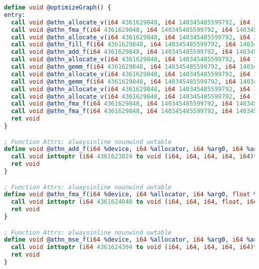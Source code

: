 \begin{lstlisting}[language=llvm,basicstyle=\small,caption=Пример LLVM IR]
define void @optimizeGraph() {
entry:
  call void @athn_allocate_v(i64 4361629848, i64 140345485599792, i64 140345485573008)
  call void @athn_fma_f(i64 4361629848, i64 140345485599792, i64 140345485620352, float 2.000000e+00, i64 140345485611632, float -2.000000e+00, i64 140345485573008)
  call void @athn_allocate_v(i64 4361629848, i64 140345485599792, i64 140345485573088)
  call void @athn_fill_f(i64 4361629848, i64 140345485599792, i64 140345485573088, float 0.000000e+00)
  call void @athn_add_f(i64 4361629848, i64 140345485599792, i64 140345485573088, i64 140345485573008, i64 140345485573088)
  call void @athn_allocate_v(i64 4361629848, i64 140345485599792, i64 140345485612688)
  call void @athn_gemm_f(i64 4361629848, i64 140345485599792, i64 140345485592208, i64 140345485573088, i64 140345485616152, i64 140345485612688)
  call void @athn_allocate_v(i64 4361629848, i64 140345485599792, i64 140345485612736)
  call void @athn_gemm_f(i64 4361629848, i64 140345485599792, i64 140345485595808, i64 140345485613576, i64 140345485573088, i64 140345485612736)
  call void @athn_allocate_v(i64 4361629848, i64 140345485599792, i64 140345485573088)
  call void @athn_allocate_v(i64 4361629848, i64 140345485599792, i64 140345485573088)
  call void @athn_fma_f(i64 4361629848, i64 140345485599792, i64 140345485612736, float 0xBE7AD7F2A0000000, i64 140345485616152, float 1.000000e+00, i64 140345485616152)
  call void @athn_fma_f(i64 4361629848, i64 140345485599792, i64 140345485612688, float 0xBE7AD7F2A0000000, i64 140345485613576, float 1.000000e+00, i64 140345485613576)
  ret void
}

; Function Attrs: alwaysinline nounwind uwtable
define void @athn_add_f(i64 %device, i64 %allocator, i64 %arg0, i64 %arg1, i64 %arg2) #0 {
  call void inttoptr (i64 4361623824 to void (i64, i64, i64, i64, i64)*)(i64 %device, i64 %allocator, i64 %arg0, i64 %arg1, i64 %arg2)
  ret void
}

; Function Attrs: alwaysinline nounwind uwtable
define void @athn_fma_f(i64 %device, i64 %allocator, i64 %arg0, float %arg1, i64 %arg2, float %arg3, i64 %arg4) #0 {
  call void inttoptr (i64 4361624048 to void (i64, i64, i64, float, i64, float, i64)*)(i64 %device, i64 %allocator, i64 %arg0, float %arg1, i64 %arg2, float %arg3, i64 %arg4)
  ret void
}

; Function Attrs: alwaysinline nounwind uwtable
define void @athn_mse_f(i64 %device, i64 %allocator, i64 %arg0, i64 %arg1, i64 %arg2) #0 {
  call void inttoptr (i64 4361624304 to void (i64, i64, i64, i64, i64)*)(i64 %device, i64 %allocator, i64 %arg0, i64 %arg1, i64 %arg2)
  ret void
}


\end{lstlisting}

